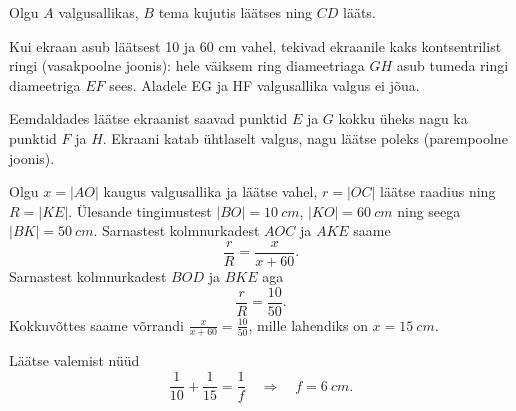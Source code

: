 Olgu $A$ valgusallikas, $B$ tema kujutis läätses ning $CD$ lääts.

Kui ekraan asub läätsest 10 ja 60 cm vahel, tekivad ekraanile kaks kontsentrilist ringi (vasakpoolne joonis): hele väiksem ring diameetriaga $GH$ asub tumeda ringi diameetriga $EF$ sees. Aladele EG ja HF valgusallika valgus ei jõua.

Eemdaldades läätse ekraanist saavad punktid $E$ ja $G$ kokku üheks nagu ka punktid $F$ ja $H$. Ekraani katab ühtlaselt valgus, nagu läätse poleks (parempoolne joonis).

Olgu $x=|AO|$ kaugus valgusallika ja läätse vahel, $r=|OC|$ läätse raadius ning $R=|KE|$. Ülesande tingimustest $|BO|=\SI{10}{cm}$, $|KO|=\SI{60}{cm}$ ning seega $|BK|=\SI{50}{cm}$. Sarnastest kolmnurkadest $AOC$ ja $AKE$ saame
\[
  \frac{r}{R}=\frac{x}{x+60}.
\]
Sarnastest kolmnurkadest $BOD$ ja $BKE$ aga
\[
  \frac{r}{R}=\frac{10}{50}.
\]
Kokkuvõttes saame võrrandi $\displaystyle{\frac{x}{x+60}=\frac{10}{50}}$, mille lahendiks on $x=\SI{15}{cm}$.

Läätse valemist nüüd
\[
  \frac{1}{10}+\frac{1}{15}=\frac{1}{f}\quad \Rightarrow \quad f=\SI{6}{cm}.
\]
\probend